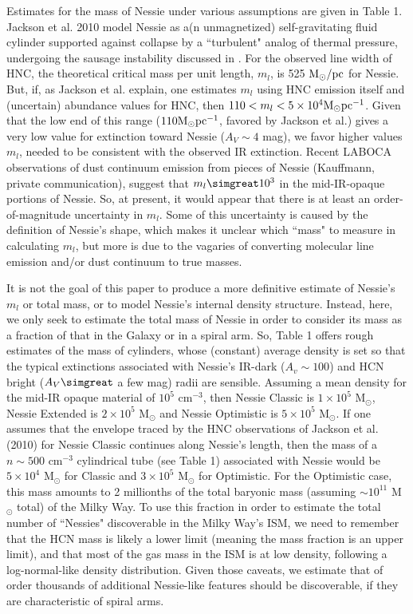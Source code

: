 Estimates for the mass of Nessie under various assumptions are given in Table 1.  Jackson et  al. 2010  model Nessie as a(n unmagnetized) self-gravitating fluid cylinder supported against collapse by a ``turbulent" analog of thermal pressure, undergoing the sausage instability discussed in \citet{1953ApJ...118..116C}. For the observed line width of HNC, the theoretical critical mass per unit length, $m_l$, is 525 ${\rm M}_\odot/{\rm pc}$ for Nessie.  But, if, as Jackson et al. explain, one estimates $m_l$ using HNC emission itself and (uncertain) abundance values for HNC, then $110 < m_l < 5 \times 10^4 {\rm M}_\odot {\rm pc}^{-1}$. Given that the low end of this range ($110 {\rm M}_\odot {\rm pc}^{-1}$, favored by Jackson et al.) gives a very low value for extinction toward Nessie ($A_V \sim 4$ mag), we favor higher values $m_l$, needed to be consistent with the observed IR extinction. Recent LABOCA observations of dust continuum emission from pieces of Nessie (Kauffmann, private communication), suggest that $m_l \simgreat 10^3$ in the mid-IR-opaque portions of Nessie.  
So, at present, it would appear that there is at least an order-of-magnitude uncertainty in $m_l$.  Some of this uncertainty is caused by the definition of Nessie's shape, which makes it unclear which ``mass" to measure in calculating $m_l$, but more is due to the vagaries of converting molecular line emission and/or dust continuum to true masses. 

It is not the goal of this paper to produce a more definitive estimate of Nessie's $m_l$ or total mass, or to model Nessie's internal density structure.  Instead, here, we only seek to estimate the total mass of Nessie in order to consider its mass as a fraction of that in the Galaxy or in a spiral arm.  So, Table 1 offers rough estimates of the mass of cylinders, whose (constant) average density is set so that the typical extinctions associated with Nessie's IR-dark ($A_v\sim 100$) and HCN bright ($A_V \simgreat$ a few mag) radii are sensible.  Assuming a mean density for the mid-IR opaque material of $10^5$ cm$^{-3}$, then Nessie Classic is $1 \times 10^5$ M$_\odot$, Nessie Extended is $2 \times 10^5$ M$_\odot$ and Nessie Optimistic is $5 \times 10^5$ M$_\odot$.  If one assumes that the envelope traced by the HNC observations of Jackson et al. (2010) for Nessie Classic continues along Nessie's length, then the mass of a $n\sim 500$ cm$^{-3}$ cylindrical tube (see Table 1) associated with Nessie would be $5 \times 10^4$ M$_\odot$ for Classic and $3 \times 10^5$ M$_\odot$ for Optimistic.  For the Optimistic case, this mass amounts to 2 millionths of the total baryonic mass (assuming $\sim 10^{11}$ M$_\odot$ total) of the Milky Way.  To use this fraction in order to estimate the total number of ``Nessies" discoverable in the Milky Way's ISM, we need to remember that the HCN mass is likely a lower limit (meaning the mass fraction is an upper limit), and that most of the gas mass in the ISM is at low density, following a log-normal-like density distribution.  Given those caveats, we estimate that of order thousands of additional Nessie-like features should be discoverable, if they are characteristic of spiral arms.
